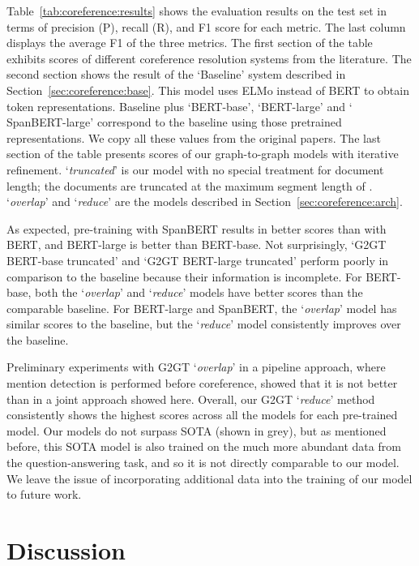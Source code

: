 \documentclass[11pt]{article}
\begin{document}
Table~\ref{tab:coreference:results} shows the evaluation results on the test set in terms of precision (P), recall (R), and F1 score for each metric. The last column displays the average F1 of the three metrics. The first section of the table exhibits scores of different coreference resolution systems from the literature.  The second section shows the result of the `Baseline' \cite{lee-etal-2018-higher} system described in Section~\ref{sec:coreference:base}. This model uses ELMo
\cite{peters-etal-2018-deep} instead of BERT to obtain token representations. Baseline plus `BERT-base', `BERT-large' \cite{joshi-etal-2019-bert} and ` SpanBERT-large' \cite{joshi-etal-2020-spanbert} correspond to the baseline using those pretrained representations. We copy all these values from the original papers. The last section of the table presents scores of our graph-to-graph  models with iterative refinement. `\emph{truncated}' is our model with no special treatment for document length; the documents are truncated at the maximum segment length of . `\emph{overlap}' and `\emph{reduce}' are the models described in Section~\ref{sec:coreference:arch}.

As expected, pre-training with SpanBERT results in better scores than with BERT, and BERT-large is better than BERT-base.
Not surprisingly, `G2GT BERT-base truncated' and `G2GT BERT-large truncated' perform poorly in comparison to the baseline because their information is incomplete. For BERT-base, both the `\emph{overlap}' and `\emph{reduce}' models have better scores than the comparable baseline.  For BERT-large and SpanBERT, the `\emph{overlap}' model has similar scores to the baseline, but the `\emph{reduce}' model consistently improves over the baseline. 

Preliminary experiments with G2GT `\emph{overlap}' in a pipeline approach, where mention detection is performed before coreference, showed that it is not better than in a joint approach showed here. Overall, our G2GT `\emph{reduce}' method consistently shows the highest scores across all the models for each pre-trained model. 
Our models do not surpass SOTA \cite{wu-etal-2020-corefqa} (shown in grey), but as mentioned before, this SOTA model is also trained on the much more abundant data from the question-answering task, and so it is not directly comparable to our model. We leave the issue of incorporating additional data into the training of our model to future work.

\section{Discussion} 
\label{sec:coreference:discussion}
\end{document}
